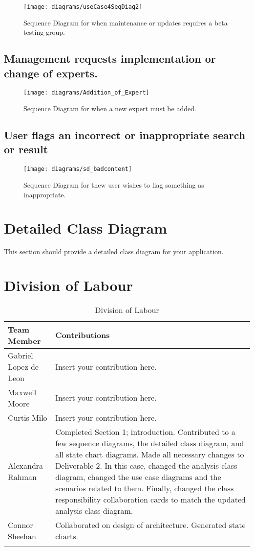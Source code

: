 \documentclass[titlepage]{article}
\begin{document}
\begin{figure}[H]
\texttt{[image: diagrams/useCase4SeqDiag2]}
\caption{Sequence Diagram for when maintenance or updates requires a beta testing group.}\label{sd:survey_of_experts}
\end{figure}
\subsection{Management requests implementation or change of experts.}
\begin{figure}[H]
\texttt{[image: diagrams/Addition\_of\_Expert]}
\caption{Sequence Diagram for when a new expert must be added.}\label{sd:addition_of_expert}
\end{figure}
\subsection{User flags an incorrect or inappropriate search or result}
\begin{figure}[H]
\texttt{[image: diagrams/sd\_badcontent]}
\caption{Sequence Diagram for thew user wishes to flag something as inappropriate.}\label{sd:bad_content}
\end{figure}
\section{Detailed Class Diagram}
\label{sec:detailed_class_diagram}
This section should provide a detailed class diagram for your application.

\pagebreak
\appendix
\section{Division of Labour}
\label{sec:division_of_labour}

\begin{longtable}{| p{} | p{} |}
			\hline
			\textbf {Team Member} & \textbf{Contributions}\\ 
			\hline
			Gabriel Lopez de Leon & Insert your contribution here.
			\\
			\hline
			Maxwell Moore & Insert your contribution here.
			\\
			\hline
			Curtis Milo & Insert your contribution here.
			\\ 
			\hline
			Alexandra Rahman & Completed Section 1; introduction. Contributed to a few sequence diagrams, the detailed class diagram, and all state chart diagrams. Made all necessary changes to Deliverable 2. In this case, changed the analysis class diagram, changed the use case diagrams and the scenarios related to them. Finally, changed the class responsibility collaboration cards to match the updated analysis class diagram.
			\\
			\hline
			Connor Sheehan & Collaborated on design of architecture. Generated state charts.
			\\
			\hline
			
			\caption{Division of Labour}
	\end{longtable}
\end{document}
